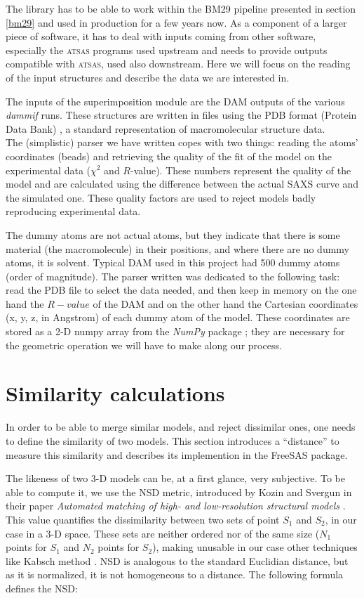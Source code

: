 \documentclass[a4paper, 11pt]{report}
\begin{document}
The library has to be able to work within the BM29 pipeline presented 
in section \ref{bm29} and used in production for a few years  now. 
As a component of a larger piece of software, it has to deal with 
inputs coming from other software, especially the \textsc{atsas} 
programs used upstream and needs to provide outputs compatible with 
\textsc{atsas}, used also downstream. 
Here we will focus on the reading of the input structures and describe the
data we are interested in.

The inputs of the superimposition module are the DAM outputs of the 
various \textit{dammif} runs. 
These structures are written in files using the PDB format (Protein 
Data Bank) \cite{pdb}, a standard representation of macromolecular 
structure data.\\
The (simplistic) parser we have written copes with two things: reading 
the atoms' coordinates (beads) and retrieving the quality of the fit 
of the model on the experimental data ($\chi^2$ and $R$-value). 
These numbers represent the quality of the model and are calculated 
using the difference between the actual SAXS curve and the simulated 
one. 
These quality factors are used to reject models badly reproducing 
experimental data.

The dummy atoms are not actual atoms, but they indicate that there is 
some material (the macromolecule) in their positions, and where there 
are no dummy atoms, it is solvent. 
Typical DAM used in this project had 500 dummy atoms (order of 
magnitude). 
The parser written was dedicated to the following task: read the PDB 
file to select the data needed, and then keep in memory on the one 
hand the $R-value$ of the DAM and on the other hand the Cartesian 
coordinates (x, y, z, in Angstrom) of each dummy atom of the model. 
These coordinates are stored as a 2-D numpy array from the 
\textit{NumPy} package \cite{numpy}; they are necessary for the 
geometric operation we will have to make along our process.

\section{Similarity calculations}

In order to be able to merge similar models, and reject dissimilar 
ones, one needs to define the similarity of two models. 
This section introduces a ``distance'' to measure this  
similarity and describes its implemention in the FreeSAS
package.

The likeness of two 3-D models can be, at a first glance, very 
subjective. 
To be able to compute it, we use the NSD metric, introduced by Kozin 
and Svergun in their paper \textit{Automated matching of high- and 
low-resolution structural models} \cite{supcomb}. 
This value quantifies the dissimilarity between two sets of 
point $S_{1}$ and $S_{2}$, in our case in a 3-D space.
These sets are neither ordered nor of the same size ($N_{1}$ points 
for $S_{1}$ and $N_{2}$ points for $S_{2}$), making unusable in our 
case other techniques like Kabsch method \cite{kabsch1976}.
NSD is analogous to the standard Euclidian distance, but as it is 
normalized, it is not homogeneous to a distance. 
The following formula defines the NSD:
\end{document}
